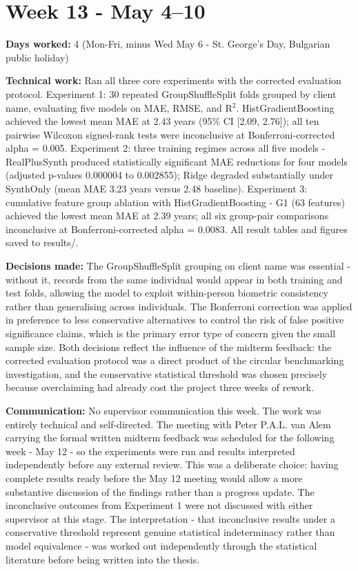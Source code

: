 \documentclass[11pt,a4paper]{article}
\begin{document}
\section{Week 13  -  May 4–10}

\textbf{Days worked:} 4 (Mon-Fri, minus Wed May 6 - St. George's Day, Bulgarian public holiday)

\textbf{Technical work:} Ran all three core experiments with the corrected evaluation protocol. Experiment 1: 30 repeated GroupShuffleSplit folds grouped by client name, evaluating five models on MAE, RMSE, and R$^{2}$. HistGradientBoosting achieved the lowest mean MAE at 2.43 years (95\% CI [2.09, 2.76]); all ten pairwise Wilcoxon signed-rank tests were inconclusive at Bonferroni-corrected alpha = 0.005. Experiment 2: three training regimes across all five models  -  RealPlusSynth produced statistically significant MAE reductions for four models (adjusted p-values 0.000004 to 0.002855); Ridge degraded substantially under SynthOnly (mean MAE 3.23 years versus 2.48 baseline). Experiment 3: cumulative feature group ablation with HistGradientBoosting  -  G1 (63 features) achieved the lowest mean MAE at 2.39 years; all six group-pair comparisons inconclusive at Bonferroni-corrected alpha = 0.0083. All result tables and figures saved to results/.

\textbf{Decisions made:} The GroupShuffleSplit grouping on client name was essential  -  without it, records from the same individual would appear in both training and test folds, allowing the model to exploit within-person biometric consistency rather than generalising across individuals. The Bonferroni correction was applied in preference to less conservative alternatives to control the risk of false positive significance claims, which is the primary error type of concern given the small sample size. Both decisions reflect the influence of the midterm feedback: the corrected evaluation protocol was a direct product of the circular benchmarking investigation, and the conservative statistical threshold was chosen precisely because overclaiming had already cost the project three weeks of rework.

\textbf{Communication:} No supervisor communication this week. The work was entirely technical and self-directed. The meeting with Peter P.A.L. van Alem carrying the formal written midterm feedback was scheduled for the following week  -  May 12  -  so the experiments were run and results interpreted independently before any external review. This was a deliberate choice: having complete results ready before the May 12 meeting would allow a more substantive discussion of the findings rather than a progress update. The inconclusive outcomes from Experiment 1 were not discussed with either supervisor at this stage. The interpretation  -  that inconclusive results under a conservative threshold represent genuine statistical indeterminacy rather than model equivalence  -  was worked out independently through the statistical literature before being written into the thesis.
\end{document}

